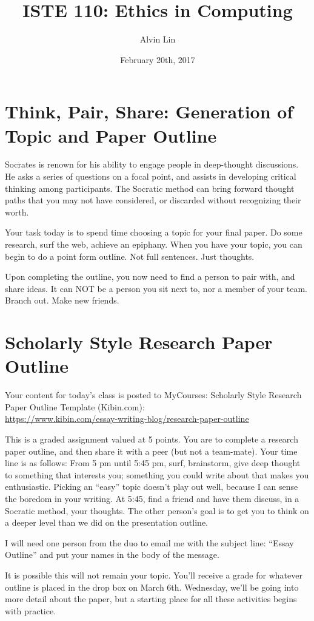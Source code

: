 \documentclass[letterpaper, 12pt]{article}
\title{ISTE 110: Ethics in Computing}
\author{Alvin Lin}
\date{February 20th, 2017}
\begin{document}
\maketitle

\section*{Think, Pair, Share: Generation of Topic and Paper Outline}
Socrates is renown for his ability to engage people in deep-thought
discussions. He asks a series of questions on a focal point, and assists in
developing critical thinking among participants. The Socratic method can bring
forward thought paths that you may not have considered, or discarded without
recognizing their worth. \par
Your task today is to spend time choosing a topic for your final paper. Do some
research, surf the web, achieve an epiphany. When you have your topic, you can
begin to do a point form outline. Not full sentences. Just thoughts. \par
Upon completing the outline, you now need to find a person to pair with, and
share ideas. It can NOT be a person you sit next to, nor a member of your
team. Branch out. Make new friends. \par

\section*{Scholarly Style Research Paper Outline}
Your content for today's class is posted to MyCourses:
Scholarly Style Research Paper Outline Template (Kibin.com): \\
\url{https://www.kibin.com/essay-writing-blog/research-paper-outline} \par
This is a graded assignment valued at 5 points. You are to complete a research
paper outline, and then share it with a peer (but not a team-mate).
Your time line is as follows: From 5 pm until 5:45 pm, surf, brainstorm, give
deep thought to something that interests you; something you could write about
that makes you enthusiastic. Picking an ``easy'' topic doesn't play out well,
because I can sense the boredom in your writing. At 5:45, find a friend and
have them discuss, in a Socratic method, your thoughts. The other person's goal
is to get you to think on a deeper level than we did on the presentation
outline. \par
I will need one person from the duo to email me with the subject line: ``Essay
Outline'' and put your names in the body of the message. \par
It is possible this will not remain your topic. You'll receive a grade for
whatever outline is placed in the drop box on March 6th. Wednesday, we'll be
going into more detail about the paper, but a starting place for all these
activities begins with practice.
\end{document}
